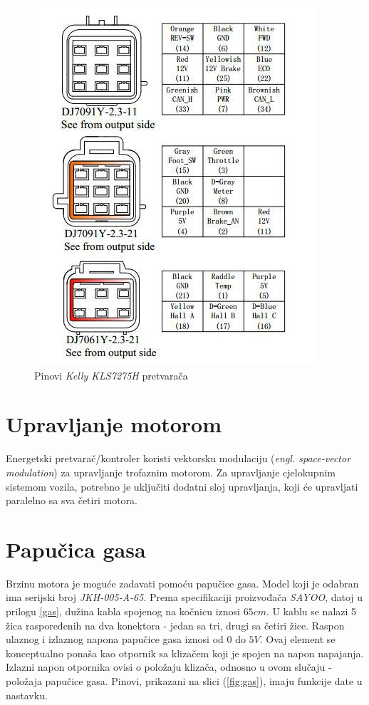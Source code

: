 \begin{figure}
\begin{center}
\includegraphics[scale=1]{slike/kellypins.jpg}
\end{center}
\caption{Pinovi \textit{Kelly KLS7275H} pretvarača}
\label{fig:kellypins}
\end{figure}

\section{Upravljanje motorom}

\qquad Energetski pretvarač/kontroler koristi vektorsku modulaciju (\textit{engl. space-vector modulation}) za upravljanje trofaznim motorom. Za upravljanje cjelokupnim sistemom vozila, potrebno je uključiti dodatni sloj upravljanja, koji će upravljati paralelno sa sva četiri motora.

\section{Papučica gasa}

\qquad Brzinu motora je moguće zadavati pomoću papučice gasa. Model koji je odabran ima serijski broj \textit{JKH-005-A-65}. Prema specifikaciji proizvođača \textit{SAYOO}, datoj u prilogu \ref{gas}, dužina kabla spojenog na kočnicu iznosi $65cm$. U kablu se nalazi 5 žica raspoređenih na dva konektora - jedan sa tri, drugi sa četiri žice. Raspon ulaznog i izlaznog napona papučice gasa iznosi od $0$ do $5V$. Ovaj element se konceptualno ponaša kao otpornik sa klizačem koji je spojen na napon napajanja. Izlazni napon otpornika ovisi o položaju klizača, odnosno u ovom slučaju - položaja papučice gasa. Pinovi, prikazani na slici (\ref{fig:gas}), imaju funkcije date u nastavku.

